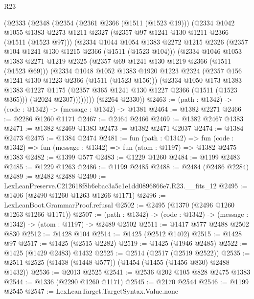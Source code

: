 \begin{lexlean}{R23}
\begin{coremodule}
    (@2333
      (@2348
        (@2354
          (@2361 @2366 (@1511 (@1523 @19)))
          (@2334
            @1042
            @1055
            @1383
            @2273
            @1211
            @2327
            (@2357 @97 @1241 @130 @1211 @2366 (@1511 (@1523 @97)))
            (@2334
              @1044
              @1054
              @1383
              @2272
              @1215
              @2326
              (@2357 @104 @1241 @130 @1215 @2366 (@1511 (@1523 @104)))
              (@2334
                @1046
                @1053
                @1383
                @2271
                @1219
                @2325
                (@2357 @69 @1241 @130 @1219 @2366 (@1511 (@1523 @69)))
                (@2334
                  @1048
                  @1052
                  @1383
                  @1920
                  @1223
                  @2324
                  (@2357 @156 @1241 @130 @1223 @2366 (@1511 (@1523 @156)))
                  (@2334
                    @1050
                    @173
                    @1383
                    @1383
                    @1227
                    @1175
                    (@2357 @365 @1241 @130 @1227 @2366 (@1511 (@1523 @365)))
                    (@2024 @2307))))))))
      (@2264 @2330))
@2463 := (path : @1342) -> (code : @1342) -> (message : @1342) -> @1381
@2464 := @1382 @2271
@2466 := @2286 @1260 @1171
@2467 := @2464 @2466
@2469 := @1382 @2467 @1383
@2471 := @1382 @2469 @1383
@2473 := @1382 @2471 @2037
@2474 := @1384 @2473
@2475 := @1384 @2474
@2481 := fun (path : @1342) =>
  fun (code : @1342) => fun (message : @1342) => fun (atom : @1197) => @1382 @2475 @1383
@2482 := @1399 @577
@2483 := @1229 @1260
@2484 := @1199 @2483
@2485 := @1229 @1263
@2486 := @1199 @2485
@2488 := @2484 (@2486 @2284)
@2489 := @2482 @2488
@2490 := LexLeanPreserve.C212618f8b6ebac3a5c1e1dd0896866e7.R23.__fits_12
@2495 := @1406 (@2490 @1260 @1263 @1266 @1171)
@2496 := LexLeanBoot.GrammarProof.refusal
@2502 := @2495 (@1370 (@2496 @1260 @1263 @1266 @1171))
@2507 := (path : @1342) -> (code : @1342) -> (message : @1342) -> (atom : @1197) -> @2489 @2502
@2511 := @1417 @577 @2488 @2502 @830
@2512 := @1428 @104
@2514 := @1425 (@2512 @1402)
@2515 := @1428 @97
@2517 := @1425 (@2515 @2282)
@2519 := @1425 (@1946 @2485)
@2522 := @1425 (@1429 @2483) @1432
@2525 := @2514 (@2517 (@2519 @2522))
@2535 := @2511 @2525 (@1438 (@1448 @577)) (@1454 (@1455 (@1456 @830) @2488 @1432))
@2536 := @2013 @2525
@2541 := @2536 @202 @105 @828 @2475 @1383
@2544 := @1336 (@2290 @1260 @1171)
@2545 := @2170 @2544
@2546 := @1199 @2545
@2547 := LexLeanTarget.TargetSyntax.Value.none

\end{coremodule}
\end{lexlean}
